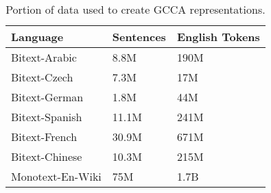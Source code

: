 \documentclass[11pt]{article}
\begin{document}
\begin{table}[htbp]
  \centering
  \begin{tabular}{lll}
    Language & Sentences & English Tokens \\
    \hline
    Bitext-Arabic   & 8.8M   & 190M  \\
    Bitext-Czech    & 7.3M   & 17M   \\
    Bitext-German   & 1.8M   & 44M   \\
    Bitext-Spanish  & 11.1M  & 241M  \\
    Bitext-French   & 30.9M  & 671M  \\
    Bitext-Chinese  & 10.3M  & 215M  \\
    Monotext-En-Wiki& 75M    & 1.7B 
  \end{tabular}  
  \caption{Portion of data used to create GCCA representations.}
  \label{tab:dataperlang}
\end{table}
\end{document}
